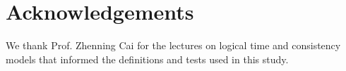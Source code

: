 \section*{Acknowledgements}

We thank Prof. Zhenning Cai for the lectures on logical time and consistency models that informed the definitions and tests used in this study.
